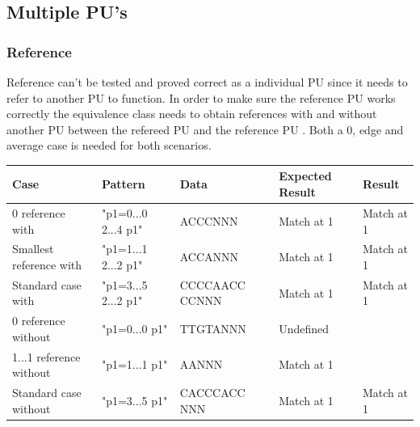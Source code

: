 \documentclass[12pt]{article}
\newcommand{\pu}{PU }
\newcommand{\pus}{PU's }
\begin{document}
\subsection{Multiple \pus}

\subsubsection{Reference}

Reference can't be tested and proved correct as a individual \pu since it needs to refer to another \pu
to function. 
In order to make sure the reference \pu works correctly the equivalence class needs to obtain references with and
without another \pu between the refereed \pu and the reference \pu. Both a 0, edge and average case is needed for both
scenarios.
\begin{table}[H]
\begin{tabular}{p{4cm}|p{3cm}|p{2.5cm}|p{2.5cm}|p{2.5cm}}
Case 			& Pattern & Data & Expected Result & Result \\ \hline
0 reference with 	& "p1=0...0 2...4 p1" & ACCCNNN & Match at 1 & Match at 1 \\ \hline
Smallest reference with 	& "p1=1...1 2...2 p1" & ACCANNN & Match at 1 & Match at 1 \\ \hline
Standard case with	& "p1=3...5 2...2 p1" & CCCCAACC CCNNN & Match at 1 & Match at 1\\ \hline
0 reference without	& "p1=0...0 p1" & TTGTANNN & Undefined & \\ \hline
1...1 reference without & "p1=1...1 p1" & AANNN & Match at 1 & \\ \hline
Standard case without & "p1=3...5 p1" & CACCCACC NNN & Match at 1 & Match at 1\\ \hline
\end{tabular}
\end{table}
\end{document}

